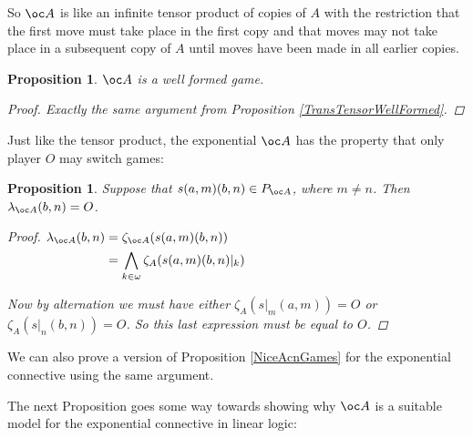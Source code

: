 \documentclass[11pt]{article} %
\theoremstyle{plain} %
\newtheorem{proposition}[theorem]{Proposition}
\theoremstyle{definition} %
\theoremstyle{note}
\theoremstyle{exercisestyle}
\begin{document}
So $\oc A$ is like an infinite tensor product of copies of $A$ with the restriction that the first move must take place in the first copy and that moves may not take place in a subsequent copy of $A$ until moves have been made in all earlier copies.  

\begin{proposition}
  $\oc A$ is a well formed game.
  \begin{proof}
    Exactly the same argument from Proposition \ref{TransTensorWellFormed}.
  \end{proof}
\end{proposition}

Just like the tensor product, the exponential $\oc A$ has the property that only player $O$ may switch games:

\begin{proposition}
  Suppose that $s(a,m)(b,n)\in P_{\oc A}$, where $m\ne n$.  Then $\lambda_{\oc A}(b,n)=O$.  
  \begin{proof}
    $\begin{aligned}[t]
      \lambda_{\oc A}(b,n) &= \zeta_{\oc A}(s(a,m)(b,n))\\
      &= \bigwedge_{k\in\omega}\zeta_A(s(a,m)(b,n)\vert_k)
    \end{aligned}$

    Now by alternation we must have either $\zeta_A(s\vert_m(a,m))=O$ or $\zeta_A(s\vert_n(b,n))=O$.  So this last expression must be equal to $O$.
  \end{proof}
\end{proposition}

We can also prove a version of Proposition \ref{NiceAcnGames} for the exponential connective using the same argument.

The next Proposition goes some way towards showing why $\oc A$ is a suitable model for the exponential connective in linear logic:
\end{document}
